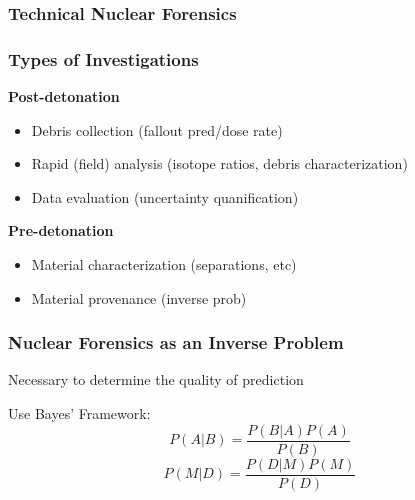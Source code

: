 
\begin{frame}
  \frametitle{Technical Nuclear Forensics}

\end{frame}

\begin{frame}
  \frametitle{Types of Investigations}
  \textbf{Post-detonation}
  \begin{itemize}
    \item Debris collection (fallout pred/dose rate)
    \item Rapid (field) analysis (isotope ratios, debris characterization)
    \item Data evaluation (uncertainty quanification)
  \end{itemize}

  \textbf{Pre-detonation}
  \begin{itemize}
    \item Material characterization (separations, etc)
    \item Material provenance (inverse prob)
  \end{itemize}
\end{frame}


\begin{frame}
  \frametitle{Nuclear Forensics as an Inverse Problem}
  Necessary to determine the quality of prediction

  Use Bayes' Framework:
  $$ P(A|B) = \frac{P(B|A)P(A)}{P(B)} $$
  $$ P(M|D) = \frac{P(D|M)P(M)}{P(D)} $$
\end{frame}

